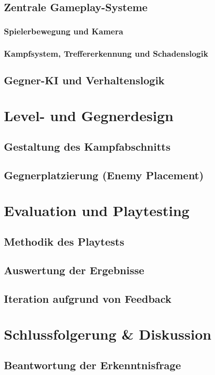 \documentclass[10pt, a4paper]{article}
\begin{document}
\subsection{Zentrale Gameplay-Systeme}
\subsubsection{Spielerbewegung und Kamera}
\subsubsection{Kampfsystem, Treffererkennung und Schadenslogik}
\subsection{Gegner-KI und Verhaltenslogik}

\section{Level- und Gegnerdesign}
\subsection{Gestaltung des Kampfabschnitts}
\subsection{Gegnerplatzierung (Enemy Placement)}

\section{Evaluation und Playtesting}
\label{sec:playtesting}
\subsection{Methodik des Playtests}
\subsection{Auswertung der Ergebnisse}
\subsection{Iteration aufgrund von Feedback}

\section{Schlussfolgerung \& Diskussion}
\subsection{Beantwortung der Erkenntnisfrage}
\end{document}
